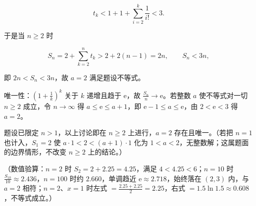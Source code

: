 \begin{answer}
\nopagebreak[4]
\[t_k<1+1+\sum_{i=2}^{k}\frac{1}{i!}<3 .\]

于是当 $n\geqslant2$ 时

\nopagebreak[4]
\[S_n=2+\sum_{k=2}^{n}t_k>2+2(n-1)=2n,\qquad S_n<3n,\]

即 $2n<S_n<3n$，故 $a=2$ 满足题设不等式。

唯一性：$\left(1+\frac1k\right)^{k}$ 关于 $k$ 递增且趋于 $\mathrm{e}$，故 $\frac{S_n}{n}\to\mathrm{e}$。若整数 $a$ 使不等式对一切 $n\geqslant2$ 成立，令 $n\to\infty$ 得 $a\leqslant\mathrm{e}\leqslant a+1$，即 $\mathrm{e}-1\leqslant a\leqslant\mathrm{e}$，由 $2<\mathrm{e}<3$ 得 $a=2$。

题设已限定 $n>1$，以上讨论即在 $n\geqslant2$ 上进行，$a=2$ 存在且唯一。（若把 $n=1$ 也计入，$S_1=2$ 使 $a\cdot1<2<(a+1)\cdot1$ 化为 $1<a<2$，无整数解；这属题面的边界情形，不改变 $n\geqslant2$ 上的结论。）

（数值验算：$n=2$ 时 $S_2=2+2.25=4.25$，满足 $4<4.25<6$；$n=10$ 时 $\frac{S_{10}}{10}\approx2.436$，$n=100$ 时约 $2.660$，单调趋近 $\mathrm{e}\approx2.718$，始终落在 $(2,3)$ 内，与 $a=2$ 相符；$n=2$、$x=1$ 时左式 $=\frac{2.25+2.25}{2}=2.25$，右式 $=1.5\ln1.5\approx0.608$，不等式成立。）


\end{answer}